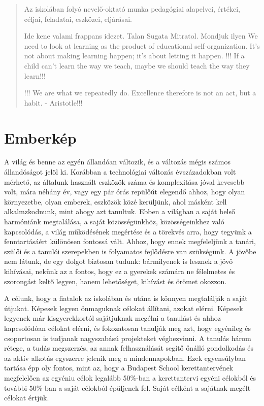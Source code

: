 \begin{quote}
      Az iskolában folyó nevelő-oktató munka pedagógiai alapelvei, értékei,
      céljai,
      feladatai, eszközei, eljárásai.

      Ide kene valami frappans idezet. Talan Sugata Mitratol. Mondjuk ilyen We
      need
      to look at learning as the product of educational self-organization. It’s
      not
      about making learning happen; it’s about letting it happen.
      !!! If a child can't learn the way we teach, maybe we should teach the
      way
      they learn!!!

      !!! We are what we repeatedly do. Excellence therefore is not an act, but
      a
      habit. - Aristotle!!!

\end{quote}






\section{Emberkép}
\label{sec:gyerekkep}

A világ és benne az egyén állandóan változik, és a változás mégis számos
állandóságot jelöl ki. Korábban a technológiai változás évszázadokban volt
mérhető, az általunk használt eszközök száma és komplexitása jóval kevesebb
volt, mára
néhány év, vagy egy pár órás repülőút elegendő ahhoz, hogy olyan környezetbe,
olyan emberek, eszközök közé kerüljünk, ahol másként kell alkalmzkodnunk, mint
ahogy azt tanultuk. Ebben a világban a saját belső harmóniánk megtalálása, a
saját közösségünkhöz, közösségeinkhez való kapcsolódás, a világ működésének
megértése és a törekvés arra, hogy tegyünk a fenntartásáért különösen fontossá
vált. Ahhoz, hogy ennek megfeleljünk a tanári, szülői és a tanulói szerepekben
is folyamatos fejlődésre van szükségünk.
A jövőbe nem látunk, de egy dolgot biztosan tudunk: bármilyenek is lesznek a
jövő
kihívásai, nekünk az a fontos, hogy ez a gyerekek számára ne félelmetes és
szorongást keltő legyen, hanem lehetőséget, kihívást és örömet okozzon.

A célunk, hogy a fiatalok az iskolában és utána is könnyen megtalálják a saját
útjukat. Képesek legyen önmaguknak célokat állítani, azokat elérni. Képesek
legyenek már kisgyerekkortól sajátjuknak megélni a tanulást és ahhoz
kapcsolódóan célokat elérni, és fokozatosan tanulják meg azt, hogy egyénileg és
csoportosan is tudjanak nagyszabású projekteket véghezvinni.
A tanulás három rétege, a tudás megszerzés, az annak felhasználását segítő
őnálló gondolkodás és az aktív alkotás egyszerre jelenik meg a mindennapokban.
Ezek egyensúlyban tartása épp oly fontos, mint az, hogy a Budapest School
kerettantervének megfelelően az egyéniu célok legalább 50\%-ban a kerettantervi
egyéni célokból és további 50\%-ban a saját célokból épüljenek fel. Saját
célként a sajátnak megélt célokat értjük.

